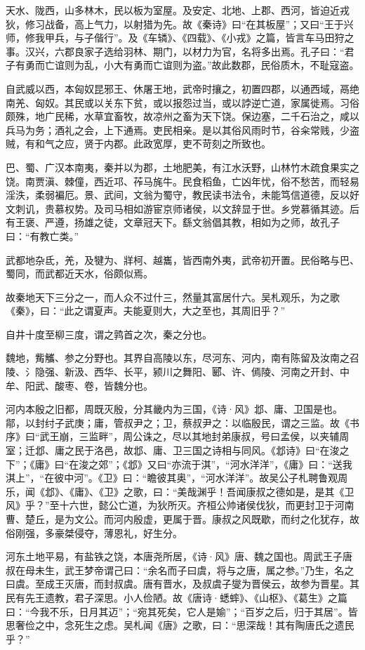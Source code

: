 \documentclass[]{article}
\begin{document}
天水、陇西，山多林木，民以板为室屋。及安定、北地、上郡、西河，皆迫近戎狄，修习战备，高上气力，以射猎为先。故《秦诗》曰``在其板屋''；又曰``王于兴师，修我甲兵，与子偕行''。及《车辚》、《四载》、《小戎》之篇，皆言车马田狩之事。汉兴，六郡良家子选给羽林、期门，以材力为官，名将多出焉。孔子曰：``君子有勇而亡谊则为乱，小大有勇而亡谊则为盗。''故此数郡，民俗质木，不耻寇盗。

自武威以西，本匈奴昆邪王、休屠王地，武帝时攘之，初置四郡，以通西域，鬲绝南羌、匈奴。其民或以关东下贫，或以报怨过当，或以誖逆亡道，家属徙焉。习俗颇殊，地广民稀，水草宜畜牧，故凉州之畜为天下饶。保边塞，二千石治之，咸以兵马为务；酒礼之会，上下通焉。吏民相亲。是以其俗风雨时节，谷籴常贱，少盗贼，有和气之应，贤于内郡。此政宽厚，吏不苛刻之所致也。

巴、蜀、广汉本南夷，秦并以为郡，土地肥美，有江水沃野，山林竹木疏食果实之饶。南贾滇、棘僮，西近邛、莋马旄牛。民食稻鱼，亡凶年忧，俗不愁苦，而轻易淫泆，柔弱褊厄。景、武间，文翁为蜀守，教民读书法令，未能笃信道德，反以好文刺讥，贵慕权势。及司马相如游宦京师诸侯，以文辞显于世。乡党慕循其迹。后有王褒、严遵，扬雄之徒，文章冠天下。繇文翁倡其教，相如为之师，故孔子曰：``有教亡类。''

武都地杂氐，羌，及犍为、牂柯、越巂，皆西南外夷，武帝初开置。民俗略与巴、蜀同，而武都近天水，俗颇似焉。

故秦地天下三分之一，而人众不过什三，然量其富居什六。吴札观乐，为之歌《秦》，曰：``此之谓夏声。夫能夏则大，大之至也，其周旧乎？''

自井十度至柳三度，谓之鹑首之次，秦之分也。

魏地，觜觿、参之分野也。其界自高陵以东，尽河东、河内，南有陈留及汝南之召陵、氵隐强、新汲、西华、长平，颍川之舞阳、郾、许、傿陵、河南之开封、中牟、阳武、酸枣、卷，皆魏分也。

河内本殷之旧都，周既灭殷，分其畿内为三国，《诗·风》邶、庸、卫国是也。鄁，以封纣子武庚；庸，管叔尹之；卫，蔡叔尹之：以临殷民，谓之三监。故《书序》曰``武王崩，三监畔''，周公诛之，尽以其地封弟康叔，号曰孟侯，以夹辅周室；迁邶、庸之民于洛邑，故邶、庸、卫三国之诗相与同风。《邶诗》曰``在浚之下''；《庸》曰``在浚之郊''；《邶》又曰``亦流于淇''，``河水洋洋''，《庸》曰：``送我淇上''，``在彼中河''。《卫》曰：``瞻彼其奥''，``河水洋洋''。故吴公子札聘鲁观周乐，闻《邶》、《庸》、《卫》之歌，曰：``美哉渊乎！吾闻康叔之德如是，是其《卫风》乎？''至十六世，懿公亡道，为狄所灭。齐桓公帅诸侯伐狄，而更封卫于河南曹、楚丘，是为文公。而河内殷虚，更属于晋。康叔之风既歇，而纣之化犹存，故俗刚强，多豪桀侵夺，薄恩礼，好生分。

河东土地平易，有盐铁之饶，本唐尧所居，《诗·风》唐、魏之国也。周武王子唐叔在母未生，武王梦帝谓己曰：``余名而子曰虞，将与之唐，属之参。''乃生，名之曰虞。至成王灭唐，而封叔虞。唐有晋水，及叔虞子燮为晋侯云，故参为晋星。其民有先王遗教，君子深思。小人俭陋。故《唐诗·蟋蟀》、《山枢》、《葛生》之篇曰：``今我不乐，日月其迈''；``宛其死矣，它人是媮''；``百岁之后，归于其居''。皆思奢俭之中，念死生之虑。吴札闻《唐》之歌，曰：``思深哉！其有陶唐氏之遗民乎？''
\end{document}
